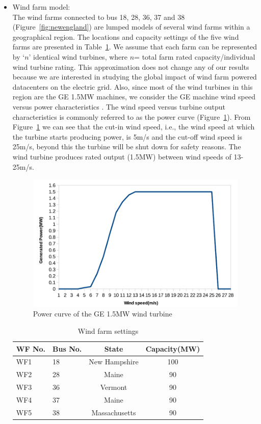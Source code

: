 \begin{itemize}
\item{Wind farm model: \\
The wind farms connected to bus 18, 28, 36, 37 and 38 (Figure~\ref{fig:newengland}) are lumped models of several wind farms within a geographical region. The locations and capacity settings of the five wind farms are presented in Table~\ref{tab:wf_setting}. We assume that each farm can be represented by `$n$' identical wind turbines, where $n$= total farm rated capacity/individual wind turbine rating. This approximation does not change any of our results because we are interested in studying the global impact of wind farm powered datacenters on the electric grid. Also, since most of the wind turbines in this region are the GE 1.5MW machines, we consider the GE machine wind speed versus power characteristics \cite{lei2006modeling}. The wind speed versus turbine output characteristics is commonly referred to as the power curve (Figure~\ref{fig:windcurve}). From Figure~\ref{fig:windcurve} we can see that the cut-in wind speed, i.e., the wind speed at which the turbine starts producing power, is 5m/s and the cut-off wind speed is 25m/s, beyond this the turbine will be shut down for safety reasons. The wind turbine produces rated output (1.5MW) between wind speeds of 13-25m/s.
\begin{figure}[ht]
\centering
\includegraphics[width=1\columnwidth]{img/wind_curve.pdf}
\caption{Power curve of the GE 1.5MW wind turbine}
\label{fig:windcurve}
\end{figure}


\begin{table}[ht]
\begin{center}
\caption{Wind farm settings}
\begin{tabular}{|l|l|c|c|}
\hline
WF No. & Bus No. & State & Capacity(MW) \\
\hline
WF1 & 18& New Hampshire & 100\\
WF2 & 28& Maine & 90 \\
WF3 & 36& Vermont & 90  \\
WF4 & 37& Maine & 90\\
WF5 & 38& Massachusetts & 90\\
\hline

\end{tabular}
   \vspace{.05in}
\label{tab:wf_setting}
\end{center}
\end{table}
}
\end{itemize}
